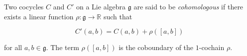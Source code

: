 Two cocycles $C$ and $C'$ on a Lie algebra $\mathfrak{g}$ are said to be \textit{cohomologous} if there exists a linear function $\rho: \mathfrak{g} \to \mathbb{R}$ such that

$$C'(a,b) = C(a,b) + \rho([a,b])$$

for all $a, b \in \mathfrak{g}$. The term $\rho([a,b])$ is the coboundary of the $1$-cochain $\rho$.
